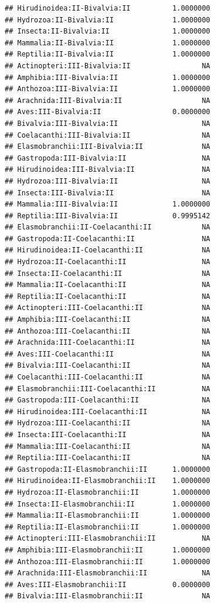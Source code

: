 \documentclass[
  12pt,
]{article}
\begin{document}
\begin{verbatim}
## Hirudinoidea:II-Bivalvia:II          1.0000000
## Hydrozoa:II-Bivalvia:II              1.0000000
## Insecta:II-Bivalvia:II               1.0000000
## Mammalia:II-Bivalvia:II              1.0000000
## Reptilia:II-Bivalvia:II              1.0000000
## Actinopteri:III-Bivalvia:II                 NA
## Amphibia:III-Bivalvia:II             1.0000000
## Anthozoa:III-Bivalvia:II             1.0000000
## Arachnida:III-Bivalvia:II                   NA
## Aves:III-Bivalvia:II                 0.0000000
## Bivalvia:III-Bivalvia:II                    NA
## Coelacanthi:III-Bivalvia:II                 NA
## Elasmobranchii:III-Bivalvia:II              NA
## Gastropoda:III-Bivalvia:II                  NA
## Hirudinoidea:III-Bivalvia:II                NA
## Hydrozoa:III-Bivalvia:II                    NA
## Insecta:III-Bivalvia:II                     NA
## Mammalia:III-Bivalvia:II             1.0000000
## Reptilia:III-Bivalvia:II             0.9995142
## Elasmobranchii:II-Coelacanthi:II            NA
## Gastropoda:II-Coelacanthi:II                NA
## Hirudinoidea:II-Coelacanthi:II              NA
## Hydrozoa:II-Coelacanthi:II                  NA
## Insecta:II-Coelacanthi:II                   NA
## Mammalia:II-Coelacanthi:II                  NA
## Reptilia:II-Coelacanthi:II                  NA
## Actinopteri:III-Coelacanthi:II              NA
## Amphibia:III-Coelacanthi:II                 NA
## Anthozoa:III-Coelacanthi:II                 NA
## Arachnida:III-Coelacanthi:II                NA
## Aves:III-Coelacanthi:II                     NA
## Bivalvia:III-Coelacanthi:II                 NA
## Coelacanthi:III-Coelacanthi:II              NA
## Elasmobranchii:III-Coelacanthi:II           NA
## Gastropoda:III-Coelacanthi:II               NA
## Hirudinoidea:III-Coelacanthi:II             NA
## Hydrozoa:III-Coelacanthi:II                 NA
## Insecta:III-Coelacanthi:II                  NA
## Mammalia:III-Coelacanthi:II                 NA
## Reptilia:III-Coelacanthi:II                 NA
## Gastropoda:II-Elasmobranchii:II      1.0000000
## Hirudinoidea:II-Elasmobranchii:II    1.0000000
## Hydrozoa:II-Elasmobranchii:II        1.0000000
## Insecta:II-Elasmobranchii:II         1.0000000
## Mammalia:II-Elasmobranchii:II        1.0000000
## Reptilia:II-Elasmobranchii:II        1.0000000
## Actinopteri:III-Elasmobranchii:II           NA
## Amphibia:III-Elasmobranchii:II       1.0000000
## Anthozoa:III-Elasmobranchii:II       1.0000000
## Arachnida:III-Elasmobranchii:II             NA
## Aves:III-Elasmobranchii:II           0.0000000
## Bivalvia:III-Elasmobranchii:II              NA

\end{verbatim}
\end{document}

